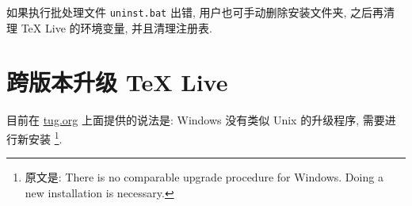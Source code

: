 如果执行批处理文件 \texttt{uninst.bat} 出错,
用户也可手动删除安装文件夹,
之后再清理 \TeX{} Live 的环境变量,
并且清理注册表.

\section{跨版本升级 \TeX{} Live}

目前在 \href{https://www.tug.org/texlive/upgrade.html}{tug.org}
上面提供的说法是:
Windows 没有类似 Unix 的升级程序,
需要进行新安装%
\footnote{原文是: There is no comparable upgrade procedure for Windows.
  Doing a new installation is necessary.}.
